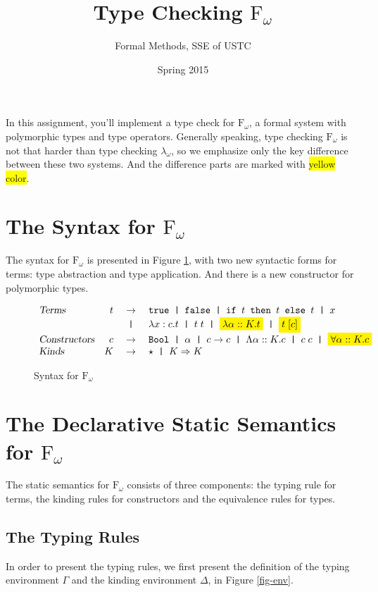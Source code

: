 \documentclass[]{article}
\newcommand{\falsee}{\texttt{false}}
\newcommand{\kto}{\Rightarrow}
\newcommand{\lo}{\text{F}_\omega}
\newcommand{\colorit}[1]{\colorbox{yellow}{$#1$}}
\newcommand{\ptext}[1]{\textsl{#1}}
\newcommand{\sep}{\texttt{ | }}
\newcommand{\truee}{\texttt{true}}
\begin{document}
\title{Type Checking $\lo$}
\author{Formal Methods, SSE of USTC}
\date{Spring 2015}
\maketitle

In this assignment, you'll implement a type check for $\lo$, a
formal system with polymorphic types and type operators.
Generally speaking, type checking $\lo$ is not that harder
than type checking $\lambda_\omega$, so we emphasize only the
key difference between these two systems. And the difference
parts are marked with \colorbox{yellow}{yellow color}.

\section{The Syntax for $\lo$}
The syntax for $\lo$ is presented in Figure \ref{fig-syntax},
with two new syntactic forms for terms: type abstraction and
type application. And there is a new constructor for polymorphic
types.

\begin{figure}[!ht]
  $$
  \begin{array}{lrcl}
    \ptext{Terms} & t & \to & \truee \sep \falsee \sep {\texttt{if } t
    \texttt{ then } t \texttt{ else } t} \sep x\\
    & & \sep & \lambda x:c.t \sep t\;t \sep \colorit{\lambda\alpha::K.t}
      \sep \colorit{t\;[c]}\\
    \ptext{Constructors} & c & \to & \texttt{Bool} \sep \alpha \sep c\to c
    \sep \Lambda\alpha::K.c \sep c\;c\sep \colorit{\forall \alpha::K.c}\\
    \ptext{Kinds} & K & \to & \star \sep K \kto K\\
  \end{array}
  $$
  \caption{Syntax for $\lo$}
  \label{fig-syntax}
\end{figure}



\section{The Declarative Static Semantics for $\lo$}
The static semantics for $\lo$ consists of three components: the typing
rule for terms, the kinding rules for constructors and the equivalence
rules for types.

\subsection{The Typing Rules}
In order to present the typing rules, we first present the definition
of the typing environment $\Gamma$ and the kinding environment $\Delta$,
in Figure \ref{fig-env}.
\end{document}
